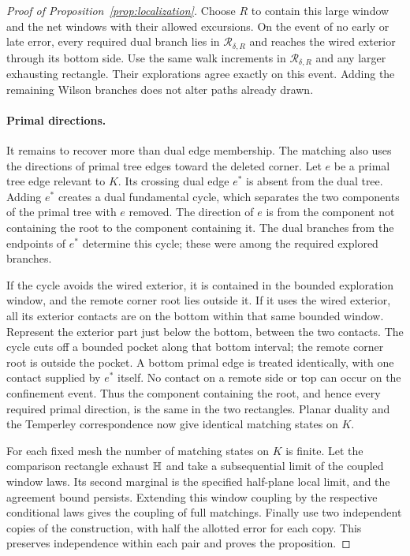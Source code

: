 \begin{proof}[Proof of Proposition~\ref{prop:localization}]
Choose $R$ to contain this large window and the net windows with their
allowed excursions.  On the event of no early or late error, every
required dual branch lies in $\mathcal R_{\delta,R}$ and reaches the
wired exterior through its bottom side.  Use the same walk increments
in $\mathcal R_{\delta,R}$ and any larger exhausting rectangle.
Their explorations agree exactly on this event.  Adding the remaining
Wilson branches does not alter paths already drawn.

\paragraph{Primal directions.}
It remains to recover more than dual edge membership.  The matching
also uses the directions of primal tree edges toward the deleted
corner.  Let $e$ be a primal tree edge relevant to $K$.  Its crossing
dual edge $e^*$ is absent from the dual tree.  Adding $e^*$ creates a
dual fundamental cycle, which separates the two components of the
primal tree with $e$ removed.  The direction of $e$ is from the
component not containing the root to the component containing it.
The dual branches from the endpoints of $e^*$ determine this cycle;
these were among the required explored branches.

If the cycle avoids the wired exterior, it is contained in the bounded
exploration window, and the remote corner root lies outside it.  If it
uses the wired exterior, all its exterior contacts are on the bottom
within that same bounded window.  Represent the exterior part just
below the bottom, between the two contacts.  The cycle cuts off a
bounded pocket along that bottom interval; the remote corner root is
outside the pocket.  A bottom primal edge is treated identically, with
one contact supplied by $e^*$ itself.  No contact on a remote side or
top can occur on the confinement event.  Thus the component containing
the root, and hence every required primal direction, is the same in
the two rectangles.  Planar duality and the Temperley correspondence
now give identical matching states on $K$.

For each fixed mesh the number of matching states on $K$ is finite.
Let the comparison rectangle exhaust $\mathbb H$ and take a subsequential
limit of the coupled window laws.  Its second marginal is the specified
half-plane local limit, and the agreement bound persists.  Extending
this window coupling by the respective conditional laws gives the
coupling of full matchings.  Finally use two independent copies of the
construction, with half the allotted error for each copy.  This
preserves independence within each pair and proves the proposition.
\end{proof}

